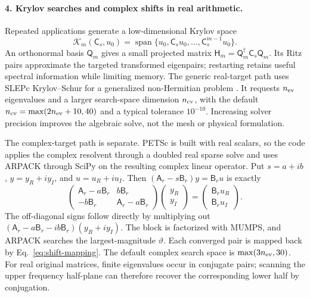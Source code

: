 \paragraph{4. Krylov searches and complex shifts in real arithmetic.}
Repeated applications generate a low-dimensional Krylov space
\begin{equation}
\mathcal K_m(\mathsf C_s,u_0)=
\operatorname{span}\{u_0,\mathsf C_su_0,\ldots,\mathsf C_s^{m-1}u_0\}.
\label{eq:krylov-space}
\end{equation}
An orthonormal basis $\mathsf Q_m$ gives a small projected matrix $\mathsf H_m=\mathsf Q_m^\dagger\mathsf C_s\mathsf Q_m$. Its Ritz pairs approximate the targeted transformed eigenpairs; restarting retains useful spectral information while limiting memory. The generic real-target path uses SLEPc Krylov--Schur for a generalized non-Hermitian problem \cite{slepc}. It requests $n_{\rm ev}$ eigenvalues and a larger search-space dimension $n_{\rm cv}$, with the default $n_{\rm cv}=\max(2n_{\rm ev}+10,40)$ and a typical tolerance $10^{-10}$. Increasing solver precision improves the algebraic solve, not the mesh or physical formulation.

The complex-target path is separate. PETSc is built with real scalars, so the code applies the complex resolvent through a doubled real sparse solve and uses ARPACK through SciPy on the resulting complex linear operator. Put $s=a+ib$, $y=y_R+iy_I$, and $u=u_R+iu_I$. Then $(\mathsf A_r-s\mathsf B_r)y=\mathsf B_ru$ is exactly
\begin{equation}
\begin{pmatrix}
\mathsf A_r-a\mathsf B_r&b\mathsf B_r\\
-b\mathsf B_r&\mathsf A_r-a\mathsf B_r
\end{pmatrix}
\begin{pmatrix}y_R\\y_I\end{pmatrix}
=\begin{pmatrix}\mathsf B_ru_R\\\mathsf B_ru_I\end{pmatrix}.
\label{eq:real-complex-resolvent}
\end{equation}
The off-diagonal signs follow directly by multiplying out $(\mathsf A_r-a\mathsf B_r-ib\mathsf B_r)(y_R+iy_I)$. The block is factorized with MUMPS, and ARPACK searches the largest-magnitude $\vartheta$. Each converged pair is mapped back by Eq.~\eqref{eq:shift-mapping}. The default complex search space is $\max(3n_{\rm ev},30)$. For real original matrices, finite eigenvalues occur in conjugate pairs; scanning the upper frequency half-plane can therefore recover the corresponding lower half by conjugation.

